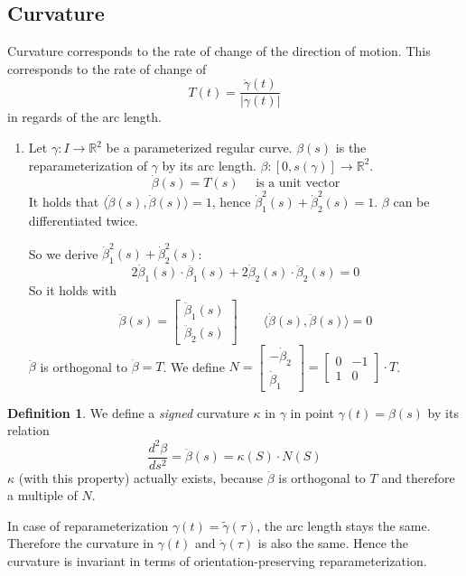 \documentclass[a4paper,landscape,twocolumn]{article}
\theoremstyle{definition}
\newtheorem{defi}{Definition}
\newcommand\abs[1]{\left|#1\right|}
\begin{document}
\subsection{Curvature}
%
Curvature corresponds to the rate of change of the direction of motion.
This corresponds to the rate of change of
\[ T(t) = \frac{\dot{\gamma}(t)}{\abs{\gamma(t)}} \]
in regards of the arc length.

\begin{enumerate}
  \item Let $\gamma: I \to \mathbb R^2$ be a parameterized regular curve.
    $\beta(s)$ is the reparameterization of $\gamma$ by its arc length.
    $\beta: [0, s(\gamma)] \to \mathbb R^2$.
    \[ \dot\beta(s) = T(s) \quad \text{ is a unit vector} \]
    It holds that $\langle \dot\beta(s), \dot\beta(s)\rangle = 1$,
    hence $\dot\beta_1^2(s) + \dot\beta_2^2(s) = 1$.
    $\beta$ can be differentiated twice.

    So we derive $\dot\beta_1^2(s) + \dot\beta_2^2(s)$:
    \[ 2\dot\beta_1(s) \cdot \ddot{\beta_1}(s) + 2 \dot\beta_2(s) \cdot \ddot{\beta}_2(s) = 0 \]
    So it holds with
    \[
      \ddot{\beta}(s) = \begin{bmatrix} \ddot{\beta}_1(s) \\ \ddot{\beta}_2(s) \end{bmatrix}
      \qquad
      \langle \dot{\beta}(s), \ddot{\beta}(s) \rangle = 0
    \]
    $\ddot{\beta}$ is orthogonal to $\dot{\beta} = T$.
    We define $N = \begin{bmatrix} -\dot{\beta}_2 \\ \dot{\beta}_1 \end{bmatrix} = \begin{bmatrix} 0 & -1 \\ 1 & 0 \end{bmatrix} \cdot T$.
\end{enumerate}

\begin{defi}
  We define a \emph{signed} curvature $\kappa$ in $\gamma$ in point $\gamma(t) = \beta(s)$
  by its relation
  \[ \frac{d^2 \beta}{ds^2} = \ddot{\beta}(s) = \kappa(S) \cdot N(S) \]
  $\kappa$ (with this property) actually exists, because $\ddot{\beta}$ is orthogonal to $T$
  and therefore a multiple of $N$.

  In case of reparameterization $\gamma(t) = \tilde{\gamma}(\tau)$, the arc length stays
  the same. Therefore the curvature in $\gamma(t)$ and $\dot{\gamma}(\tau)$ is also the same.
  Hence the curvature is invariant in terms of orientation-preserving reparameterization.
\end{defi}
\end{document}
